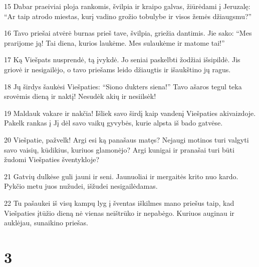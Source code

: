 \par 15 Dabar praeiviai ploja rankomis, švilpia ir kraipo galvas, žiūrėdami į Jeruzalę: “Ar taip atrodo miestas, kurį vadino grožio tobulybe ir visos žemės džiaugsmu?” 
\par 16 Tavo priešai atvėrė burnas prieš tave, švilpia, griežia dantimis. Jie sako: “Mes prarijome ją! Tai diena, kurios laukėme. Mes sulaukėme ir matome tai!” 
\par 17 Ką Viešpats nusprendė, tą įvykdė. Jo seniai paskelbti žodžiai išsipildė. Jis griovė ir nesigailėjo, o tavo priešams leido džiaugtis ir išaukštino jų ragus. 
\par 18 Jų širdys šaukėsi Viešpaties: “Siono dukters siena!” Tavo ašaros tegul teka srovėmis dieną ir naktį! Nesudėk akių ir nesiilsėk! 
\par 19 Maldauk vakare ir nakčia! Išliek savo širdį kaip vandenį Viešpaties akivaizdoje. Pakelk rankas į Jį dėl savo vaikų gyvybės, kurie alpsta iš bado gatvėse. 
\par 20 Viešpatie, pažvelk! Argi esi ką panašaus matęs? Nejaugi motinos turi valgyti savo vaisių, kūdikius, kuriuos glamonėjo? Argi kunigai ir pranašai turi būti žudomi Viešpaties šventykloje? 
\par 21 Gatvių dulkėse guli jauni ir seni. Jaunuoliai ir mergaitės krito nuo kardo. Pykčio metu juos nužudei, išžudei nesigailėdamas. 
\par 22 Tu pašaukei iš visų kampų lyg į šventas iškilmes mano priešus taip, kad Viešpaties įtūžio dieną nė vienas neištrūko ir nepabėgo. Kuriuos auginau ir auklėjau, sunaikino priešas.



\chapter{3}


